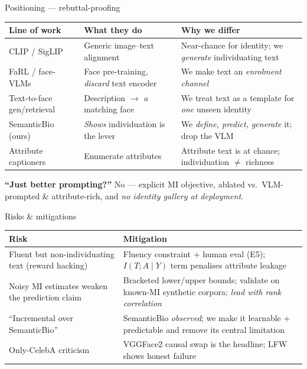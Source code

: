 \documentclass[aspectratio=169,10pt]{beamer}
\begin{document}
\begin{frame}{Positioning --- rebuttal-proofing}
  \scriptsize
  \begin{tabular}{@{}p{}p{}p{}@{}}
    \toprule
    Line of work & What they do & Why we differ \\
    \midrule
    CLIP / SigLIP & Generic image--text alignment & Near-chance for identity; we \emph{generate} individuating text \\
    FaRL / face-VLMs & Face pre-training, \emph{discard} text encoder & We make text an \emph{enrolment channel} \\
    Text-to-face gen/retrieval & Description $\to$ \emph{a} matching face & We treat text as a template for \emph{one} unseen identity \\
    SemanticBio (ours) & \emph{Shows} individuation is the lever & We \emph{define, predict, generate} it; drop the VLM \\
    Attribute captioners & Enumerate attributes & Attribute text is at chance; individuation $\neq$ richness \\
    \bottomrule
  \end{tabular}
  \vspace{0.7em}

  \footnotesize
  \textbf{``Just better prompting?''} No --- explicit MI objective, ablated vs.\ VLM-prompted
  \& attribute-rich, and \emph{no identity gallery at deployment}.
\end{frame}

\begin{frame}{Risks \& mitigations}
  \small
  \begin{tabular}{@{}p{}p{}@{}}
    \toprule
    Risk & Mitigation \\
    \midrule
    Fluent but non-individuating text (reward hacking) & Fluency constraint + human eval (E5);
      $I(T;A\mid Y)$ term penalises attribute leakage \\
    Noisy MI estimates weaken the prediction claim & Bracketed lower/upper bounds; validate on
      known-MI synthetic corpora; \emph{lead with rank correlation} \\
    ``Incremental over SemanticBio'' & SemanticBio \emph{observed}; we make it
      learnable + predictable and remove its central limitation \\
    Only-CelebA criticism & VGGFace2 causal swap is the headline; LFW shows honest failure \\
    \bottomrule
  \end{tabular}
\end{frame}
\end{document}
